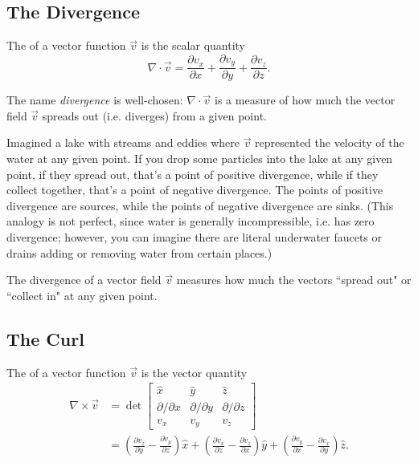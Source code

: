 \subsection{The Divergence}

\begin{definition}
The  of a vector function $\vec{v}$ is the scalar quantity
\[\nabla\cdot \vec{v}=\frac{\partial v_x}{\partial x}+\frac{\partial v_y}{\partial y}+\frac{\partial v_z}{\partial z}.\]
\end{definition}

The name \textit{divergence} is well-chosen: $\nabla\cdot\vec{v}$ is a measure of how much the vector field $\vec{v}$ spreads out (i.e. diverges) from a given point. 

Imagined a lake with streams and eddies where $\vec{v}$ represented the velocity of the water at any given point. If you drop some particles into the lake at any given point, if they spread out, that's a point of positive divergence, while if they collect together, that's a point of negative divergence. The points of positive divergence are sources, while the points of negative divergence are sinks. (This analogy is not perfect, since water is generally incompressible, i.e. has zero divergence; however, you can imagine there are literal underwater faucets or drains adding or removing water from certain places.) 

\begin{moral}
The divergence of a vector field $\vec{v}$ measures how much the vectors ``spread out" or ``collect in" at any given point.
\end{moral}


\subsection{The Curl}

\begin{definition}
The  of a vector function $\vec{v}$ is the vector quantity
\begin{align*}
    \nabla\times\vec{v}&=\det\begin{bmatrix}
    \hat{x} & \hat{y} & \hat{z}\\
    \partial/\partial x & \partial/\partial y & \partial/\partial z\\
    v_x & v_y & v_z
    \end{bmatrix}\\
    &=\left(\frac{\partial v_z}{\partial y}-\frac{\partial v_y}{\partial z}\right)\hat{x}+\left(\frac{\partial v_x}{\partial z}-\frac{\partial v_z}{\partial x}\right)\hat{y}+\left(\frac{\partial v_y}{\partial x}-\frac{\partial v_x}{\partial y}\right)\hat{z}.
\end{align*}
\end{definition}

